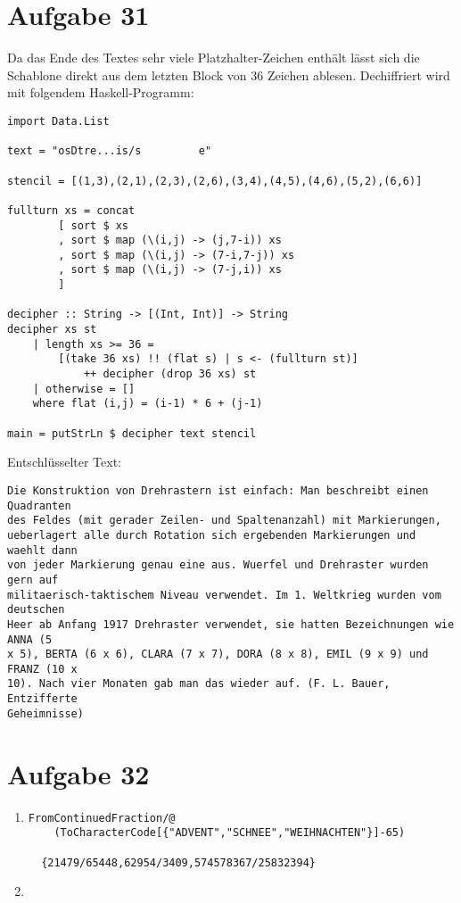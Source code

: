 \section*{Aufgabe 31}
Da das Ende des Textes sehr viele Platzhalter-Zeichen enthält lässt sich die
Schablone direkt aus dem letzten Block von $36$ Zeichen ablesen. Dechiffriert
wird mit folgendem Haskell-Programm:
\lstset{language=Haskell}
\begin{lstlisting}
import Data.List

text = "osDtre...is/s         e"

stencil = [(1,3),(2,1),(2,3),(2,6),(3,4),(4,5),(4,6),(5,2),(6,6)]

fullturn xs = concat
		[ sort $ xs
		, sort $ map (\(i,j) -> (j,7-i)) xs
		, sort $ map (\(i,j) -> (7-i,7-j)) xs
		, sort $ map (\(i,j) -> (7-j,i)) xs
		]

decipher :: String -> [(Int, Int)] -> String
decipher xs st
	| length xs >= 36 =
		[(take 36 xs) !! (flat s) | s <- (fullturn st)]
			++ decipher (drop 36 xs) st
	| otherwise = []
	where flat (i,j) = (i-1) * 6 + (j-1)

main = putStrLn $ decipher text stencil
\end{lstlisting}
Entschlüsselter Text:
\begin{verbatim}
Die Konstruktion von Drehrastern ist einfach: Man beschreibt einen Quadranten
des Feldes (mit gerader Zeilen- und Spaltenanzahl) mit Markierungen,
ueberlagert alle durch Rotation sich ergebenden Markierungen und waehlt dann
von jeder Markierung genau eine aus. Wuerfel und Drehraster wurden gern auf
militaerisch-taktischem Niveau verwendet. Im 1. Weltkrieg wurden vom deutschen
Heer ab Anfang 1917 Drehraster verwendet, sie hatten Bezeichnungen wie ANNA (5
x 5), BERTA (6 x 6), CLARA (7 x 7), DORA (8 x 8), EMIL (9 x 9) und FRANZ (10 x
10). Nach vier Monaten gab man das wieder auf. (F. L. Bauer, Entzifferte
Geheimnisse)
\end{verbatim}

\section*{Aufgabe 32}
\begin{enumerate}
	\item
	\lstset{language=Mathematica}
	\begin{lstlisting}
FromContinuedFraction/@
	(ToCharacterCode[{"ADVENT","SCHNEE","WEIHNACHTEN"}]-65)

  {21479/65448,62954/3409,574578367/25832394}
	\end{lstlisting}
	\item
\end{enumerate}
